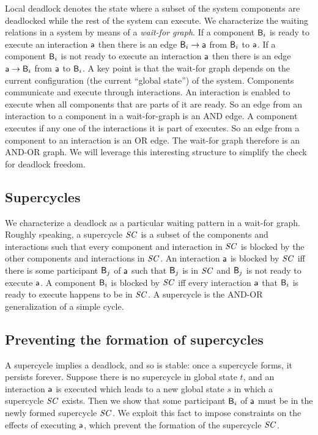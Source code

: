 Local deadlock denotes the state where a subset of the system components are deadlocked while the rest of the system can execute.
%
We characterize the waiting relations in a system by means of a {\em
  wait-for graph}. 
If a component $\mathsf{B}_i$ is ready to execute an interaction $\mathsf{a}$ then there is an edge $\mathsf{B}_i \rightarrow \mathsf{a}$ from $\mathsf{B}_i$ to $\mathsf{a}$.
If a component $\mathsf{B}_i$ is not ready to execute an interaction $\mathsf{a}$ then there is an edge $\mathsf{a} \rightarrow \mathsf{B}_i$ from $\mathsf{a}$ to $\mathsf{B}_i$.
A key point is that the wait-for graph depends on the current configuration (\ie the current ``global state'') of the system.
%
Components communicate and execute through interactions. 
An interaction is enabled to execute when all components that 
are parts of it are ready. 
So an edge from an interaction to a component in a wait-for-graph
is an AND edge. 
A component executes if any one of the interactions it is part of
executes. So an edge from a component to an interaction is an OR
edge. 
The wait-for graph therefore is an AND-OR graph. 
We will leverage this interesting structure to simplify the
check for deadlock freedom. 



\subsection{Supercycles}

We characterize a deadlock as a particular waiting pattern in a wait-for graph.
Roughly speaking, a supercycle $\mathit{SC}$ is a subset of the components and interactions such that every component and interaction in $\mathit{SC}$ is blocked by
the other components and interactions in $\mathit{SC}$. 
An interaction $\mathsf{a}$ is blocked by $\mathit{SC}$ iff there is some participant $\mathsf{B}_j$ of $\mathsf{a}$ such that $\mathsf{B}_j$ is in $\mathit{SC}$ and $\mathsf{B}_j$ is not ready to
execute $\mathsf{a}$.
A component $\mathsf{B}_i$ is blocked by $\mathit{SC}$ iff every interaction $\mathsf{a}$ that $\mathsf{B}_i$ is ready to execute happens to be in $\mathit{SC}$.
A supercycle is the AND-OR generalization of a simple cycle.



\subsection{Preventing the formation of supercycles}

A supercycle implies a deadlock, and so is stable: once a supercycle forms, it persists forever.
Suppose there is no supercycle in global state $t$, and an interaction $\mathsf{a}$ is executed which leads to a new global state $s$ in which a supercycle $\mathit{SC}$
exists. 
Then we show that some participant $\mathsf{B}_i$ of $\mathsf{a}$ must be in the newly formed supercycle $\mathit{SC}$. 
We exploit this fact to impose constraints on the effects of executing $\mathsf{a}$, which prevent the formation of the supercycle $\mathit{SC}$.

